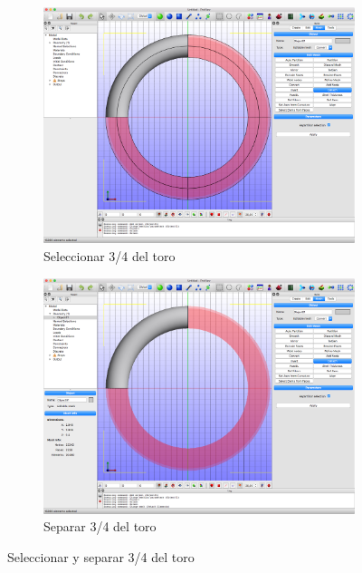 \begin{figure}[!htp]
\centering
\begin{subfigure}[b]{0.48\textwidth}
\centering
\includegraphics[width=\linewidth]{figuras_4/02c_build-detach-repartition.png}
\caption{Seleccionar 3/4 del toro}
\label{fig:02c_build-detach-repartition}
\end{subfigure}
\hfil
\begin{subfigure}[b]{0.48\textwidth}
\includegraphics[width=\linewidth]{figuras_4/03_Model-object.png}
\caption{Separar 3/4 del toro}
\label{fig:03_Model-object}
\end{subfigure}
\caption{Seleccionar y separar 3/4 del toro}
\label{fig:02c-03}
\end{figure}

